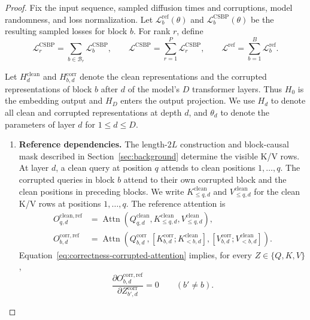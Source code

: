 \begin{proof}
Fix the input sequence, sampled diffusion times and corruptions, model
randomness, and loss normalization. Let
$\mathcal L_b^{\mathrm{ref}}(\theta)$ and
$\mathcal L_b^{\mathrm{CSBP}}(\theta)$ be the resulting sampled losses for
block $b$.
For rank $r$, define
\begin{equation}
    \mathcal L_r^{\mathrm{CSBP}}
    =\sum_{b\in\mathcal B_r}\mathcal L_b^{\mathrm{CSBP}},
    \qquad
    \mathcal L^{\mathrm{CSBP}}
    =\sum_{r=1}^{P}\mathcal L_r^{\mathrm{CSBP}},
    \qquad
    \mathcal L^{\mathrm{ref}}
    =\sum_{b=1}^{B}\mathcal L_b^{\mathrm{ref}}.
    \label{eq:correctness-loss-definitions}
\end{equation}

Let $H_d^{\mathrm{clean}}$ and $H_{b,d}^{\mathrm{corr}}$ denote the clean
representations and the corrupted representations of block $b$ after $d$ of
the model's $D$ transformer layers. Thus $H_0$ is the embedding output and
$H_D$ enters the output projection. We use $H_d$ to denote all clean and
corrupted representations at depth $d$, and $\theta_d$ to denote the
parameters of layer $d$ for $1\leq d\leq D$.

\begin{enumerate}
\item
\textbf{Reference dependencies.}
The length-$2L$ construction and block-causal mask described in
Section~\ref{sec:background} determine the visible K/V rows. At layer $d$, a
clean query at position $q$ attends to clean positions $1,\ldots,q$. The
corrupted queries in block $b$ attend to their own corrupted block and the
clean positions in preceding blocks. We write $K_{\leq q,d}^{\mathrm{clean}}$
and $V_{\leq q,d}^{\mathrm{clean}}$ for the clean K/V rows at positions
$1,\ldots,q$. The reference attention is
\begin{align}
    O_{q,d}^{\mathrm{clean,ref}}
    &= \operatorname{Attn}\!\left(
        Q_{q,d}^{\mathrm{clean}},
        K_{\leq q,d}^{\mathrm{clean}},
        V_{\leq q,d}^{\mathrm{clean}}
      \right),
    \label{eq:correctness-clean-attention}
    \\
    O_{b,d}^{\mathrm{corr,ref}}
    &= \operatorname{Attn}\!\left(
        Q_{b,d}^{\mathrm{corr}},
        [K_{b,d}^{\mathrm{corr}};K_{<b,d}^{\mathrm{clean}}],
        [V_{b,d}^{\mathrm{corr}};V_{<b,d}^{\mathrm{clean}}]
      \right).
    \label{eq:correctness-corrupted-attention}
\end{align}
Equation~\ref{eq:correctness-corrupted-attention} implies, for every
$Z\in\{Q,K,V\}$,
\begin{equation}
    \frac{\partial O_{b,d}^{\mathrm{corr,ref}}}
         {\partial Z_{b',d}^{\mathrm{corr}}}
    =0
    \qquad (b'\neq b).
    \label{eq:correctness-block-dependency}
\end{equation}


\end{enumerate}
\end{proof}
